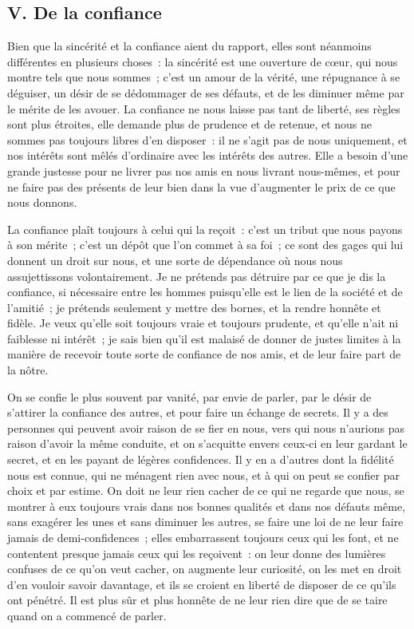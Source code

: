 \documentclass[french,twoside]{book} %
\begin{document}
\subsection[{V. De la confiance}]{V. De la confiance}
\noindent Bien que la sincérité et la confiance aient du rapport, elles sont néanmoins différentes en plusieurs choses : la sincérité est une ouverture de cœur, qui nous montre tels que nous sommes ; c’est un amour de la vérité, une répugnance à se déguiser, un désir de se dédommager de ses défauts, et de les diminuer même par le mérite de les avouer. La confiance ne nous laisse pas tant de liberté, ses règles sont plus étroites, elle demande plus de prudence et de retenue, et nous ne sommes pas toujours libres d’en disposer : il ne s’agit pas de nous uniquement, et nos intérêts sont mêlés d’ordinaire avec les intérêts des autres. Elle a besoin d’une grande justesse pour ne livrer pas nos amis en nous livrant nous-mêmes, et pour ne faire pas des présents de leur bien dans la vue d’augmenter le prix de ce que nous donnons.\par
La confiance plaît toujours à celui qui la reçoit : c’est un tribut que nous payons à son mérite ; c’est un dépôt que l’on commet à sa foi ; ce sont des gages qui lui donnent un droit sur nous, et une sorte de dépendance où nous nous assujettissons volontairement. Je ne prétends pas détruire par ce que je dis la confiance, si nécessaire entre les hommes puisqu’elle est le lien de la société et de l’amitié ; je prétends seulement y mettre des bornes, et la rendre honnête et fidèle. Je veux qu’elle soit toujours vraie et toujours prudente, et qu’elle n’ait ni faiblesse ni intérêt ; je sais bien qu’il est malaisé de donner de justes limites à la manière de recevoir toute sorte de confiance de nos amis, et de leur faire part de la nôtre.\par
On se confie le plus souvent par vanité, par envie de parler, par le désir de s’attirer la confiance des autres, et pour faire un échange de secrets. Il y a des personnes qui peuvent avoir raison de se fier en nous, vers qui nous n’aurions pas raison d’avoir la même conduite, et on s’acquitte envers ceux-ci en leur gardant le secret, et en les payant de légères confidences. Il y en a d’autres dont la fidélité nous est connue, qui ne ménagent rien avec nous, et à qui on peut se confier par choix et par estime. On doit ne leur rien cacher de ce qui ne regarde que nous, se montrer à eux toujours vrais dans nos bonnes qualités et dans nos défauts même, sans exagérer les unes et sans diminuer les autres, se faire une loi de ne leur faire jamais de demi-confidences ; elles embarrassent toujours ceux qui les font, et ne contentent presque jamais ceux qui les reçoivent : on leur donne des lumières confuses de ce qu’on veut cacher, on augmente leur curiosité, on les met en droit d’en vouloir savoir davantage, et ils se croient en liberté de disposer de ce qu’ils ont pénétré. Il est plus sûr et plus honnête de ne leur rien dire que de se taire quand on a commencé de parler.\par
\end{document}
